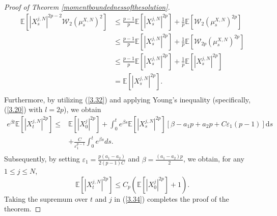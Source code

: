 \documentclass[12pt]{article}
\numberwithin{equation}{section}
\begin{document}
\begin{proof}[Proof of Theorem \ref{momentboundednessofthesolution}]
\begin{equation}
 \begin{aligned}
\mathbb{E} \left[ \left|X^{j,N}_{s}\right|^{2p-2}\mathcal{W} _2\left( \mu _{s}^{X,N} \right) ^2 \right] &\leq \tfrac{p-1}{p}\mathbb{E} \left[ \left|X^{j,N}_{s}\right|^{2p} \right] +\tfrac{1}{p}\mathbb{E} \left[ \mathcal{W} _2\left( \mu _{s}^{X,N} \right) ^{2p} \right] \\
&\leq \tfrac{p-1}{p}\mathbb{E} \left[ \left|X^{j,N}_{s}\right|^{2p} \right] +\tfrac{1}{p}\mathbb{E} \left[ \mathcal{W} _{2p}\left( \mu _{s}^{X,N} \right) ^{2p} \right]\\
&\leq \tfrac{p-1}{p}\mathbb{E} \left[ \left|X^{j,N}_{s}\right|^{2p} \right] +\tfrac{1}{p}\mathbb{E} \left[ \left|X^{j,N}_{s}\right|^{2p} \right]\\
&=\mathbb{E} \left[ \left|X^{j,N}_{s}\right|^{2p} \right].\\
\end{aligned}
\end{equation}
Furthermore, by utilizing (\ref{3.32}) and applying Young's inequality (specifically, (\ref{3.20}) with $l=2p$), we obtain
\begin{equation}\tag{5.22}\label{3.33}
\begin{aligned}
e^{\beta t}\mathbb{E} \left[ \left|X^{j,N}_{t}\right|^{2p} \right] \le &\mathbb{E} \left[ \left| X^{j}_0 \right|^{2p} \right] +\int_0^t{e^{\beta s}\mathbb{E} \left[\left|X^{j,N}_{s}\right|^{2p}\right]}\left[ \beta -a_1p+a_2p+C\varepsilon_{1} \left( p-1 \right) \right] \mathrm{d}s\\
&+\tfrac{C}{\varepsilon_{1} ^{p-1}}\int_0^t{e^{\beta s}ds}.\\
\end{aligned}
\end{equation}
Subsequently, by setting $\varepsilon_{1} =\tfrac{p\left(a_1-a_2\right)}{2\left(p-1 \right) C}$ and $\beta = \tfrac{\left(a_1-a_2\right)p}{2}$, we obtain, for any $1\leq j\leq N$, 
\begin{equation}\tag{5.23}\label{3.34}
\mathbb{E} \left[ \left|X^{j,N}_{t}\right|^{2p} \right] \le C_p\left( \mathbb{E} \left[ \left| X^{j}_0 \right|^{2p} \right] +1 \right).
\end{equation}
Taking the supremum over $t$ and $j$ in (\ref{3.34}) completes the proof of the theorem.
\end{proof}
\end{document}
